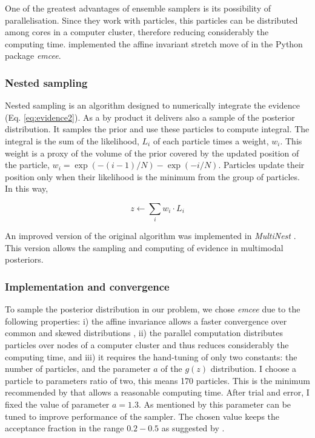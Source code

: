 One of the greatest advantages of  ensemble samplers is its possibility of parallelisation. Since they work with particles, this particles can be distributed among cores in a computer cluster, therefore reducing considerably the computing time. \citet{Foreman2013} implemented the affine invariant stretch move of \citet{Goodman2010} in the Python package \emph{emcee}. 
\subsubsection{Nested sampling}
Nested sampling \citep{Skilling2004,Skilling2006} is an algorithm designed to numerically integrate the evidence (Eq. \ref{eq:evidence2}). As a by product it delivers also a sample of the posterior distribution. It samples the prior and use these particles to compute integral. The integral is the sum of the likelihood, $L_i$ of each particle times a weight, $w_i$. This weight is a proxy of the volume of the prior covered by the updated position of the particle, $w_i = \exp(-(i-1)/N) - \exp(-i/N)$. Particles update their position only when their likelihood is the minimum from the group of particles. In this way,

\begin{equation}
z \leftarrow \sum_i w_i\cdot L_i
\end{equation}

An improved version of the original algorithm was implemented in \emph{MultiNest} \citep{Feroz2009}. This version allows the sampling and computing of evidence in multimodal posteriors.

\subsubsection{Implementation and convergence}
To sample the posterior distribution in our problem, we chose \emph{emcee} due to the following properties: i) the affine invariance allows a faster convergence over common and skewed distributions \cite[see][for detail]{Goodman2010,Foreman2013}, ii) the parallel computation distributes particles over nodes of a computer cluster and thus reduces considerably the computing time, and iii) it requires the hand-tuning of only two constants: the number of particles, and the parameter $a$ of the $g(z)$ distribution. I choose a particle to parameters ratio of two, this means 170 particles. This is the minimum recommended by \citet{Foreman2013} that allows a reasonable computing time. After trial and error, I fixed the value of parameter $a=1.3$. As mentioned by \citet{Goodman2010} this parameter can be tuned to improve performance of the sampler. The chosen value keeps the acceptance fraction in the range $0.2-0.5$ as suggested by \citet{Foreman2013}.

